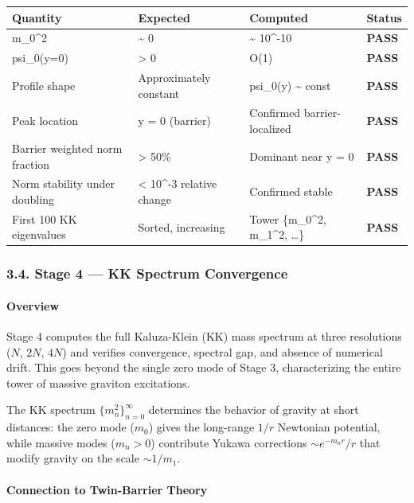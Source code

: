 \documentclass[
  11pt,
]{article}
\begin{document}
\begin{longtable}[]{@{}llll@{}}
\toprule
Quantity & Expected & Computed & Status\tabularnewline
\midrule
\endhead
m\_0\^{}2 & \textasciitilde{} 0 & \textasciitilde{} 10\^{}-10 &
\textbf{PASS}\tabularnewline
psi\_0(y=0) & \textgreater{} 0 & O(1) & \textbf{PASS}\tabularnewline
Profile shape & Approximately constant & psi\_0(y) \textasciitilde{}
const & \textbf{PASS}\tabularnewline
Peak location & y = 0 (barrier) & Confirmed barrier-localized &
\textbf{PASS}\tabularnewline
Barrier weighted norm fraction & \textgreater{} 50\% & Dominant near y =
0 & \textbf{PASS}\tabularnewline
Norm stability under doubling & \textless{} 10\^{}-3 relative change &
Confirmed stable & \textbf{PASS}\tabularnewline
First 100 KK eigenvalues & Sorted, increasing & Tower \{m\_0\^{}2,
m\_1\^{}2, \ldots\} & \textbf{PASS}\tabularnewline
\bottomrule
\end{longtable}

\bigskip

\hypertarget{stage-4-kk-spectrum-convergence}{%
\subsubsection{3.4. Stage 4 --- KK Spectrum
Convergence}\label{stage-4-kk-spectrum-convergence}}

\hypertarget{overview-3}{%
\paragraph{Overview}\label{overview-3}}

Stage 4 computes the full Kaluza-Klein (KK) mass spectrum at three
resolutions (\(N\), \(2N\), \(4N\)) and verifies convergence, spectral
gap, and absence of numerical drift. This goes beyond the single zero
mode of Stage 3, characterizing the entire tower of massive graviton
excitations.

The KK spectrum \(\{m_n^2\}_{n=0}^{\infty}\) determines the behavior of
gravity at short distances: the zero mode (\(m_0\)) gives the long-range
\(1/r\) Newtonian potential, while massive modes (\(m_n > 0\))
contribute Yukawa corrections \(\sim e^{-m_n r}/r\) that modify gravity
on the scale \(\sim 1/m_1\).

\bigskip

\hypertarget{connection-to-twin-barrier-theory-3}{%
\paragraph{Connection to Twin-Barrier
Theory}\label{connection-to-twin-barrier-theory-3}}
\end{document}
